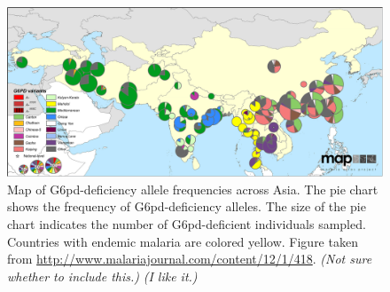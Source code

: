 \documentclass{article}
\newcommand{\gc}[1]{{\it\color{green}(#1)} }
\newcommand{\plr}[1]{{\it\color{blue}(#1)}}
\begin{document}
\begin{figure}[ht]
\begin{center}
  \includegraphics[width=1.0\textwidth]{G6pd_Howes_et_al_1475-2875-12-418-4}   %
\caption{ 
Map of G6pd-deficiency allele frequencies across Asia. 
The pie chart shows the frequency of G6pd-deficiency alleles. 
The size of the pie chart indicates the number of G6pd-deficient individuals sampled.
Countries with endemic malaria are colored yellow. 
Figure taken from \citet{Howes-g6pd-variants}
\url{http://www.malariajournal.com/content/12/1/418}. 
\gc{Not sure whether to include this.}
\plr{I like it.}
} \label{fig-G6PD-map}
\end{center}
\end{figure}




\end{document}
